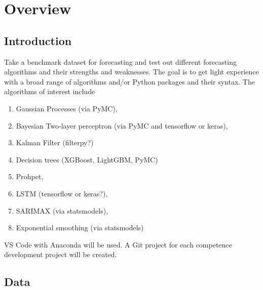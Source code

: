 \chapter{Overview}


\section{Introduction}
Take a benchmark dataset for forecasting and test out different forecasting algorithms and their strengths and weaknesses. The goal is to get light experience with a broad range of algorithms and/or Python packages and their syntax. The algorithms of interest include

\begin{enumerate}
	\item Gaussian Processes (via PyMC),
	\item Bayesian Two-layer perceptron (via PyMC and tensorflow or keras),
	\item Kalman Filter (filterpy?)
	\item Decision trees (XGBoost, LightGBM, PyMC)
	\item Prohpet,
	\item LSTM (tensorflow or keras?),
	\item SARIMAX (via statsmodels),
	\item Exponential smoothing (via statsmodels)
\end{enumerate}

VS Code with Anaconda will be used. A Git project for each competence development project will be created.


\section{Data}
